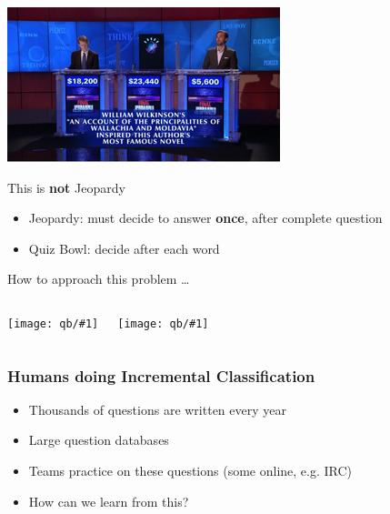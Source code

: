 \documentclass[compress]{beamer}
\newcommand{\gfxq}[2]{
\begin{center}
	\texttt{[image: qb/\#1]}
\end{center}
}
\begin{document}
\begin{frame}[plain]
  \vspace{-2cm}
		\includegraphics[width=1.0\linewidth]{qb/jeopardy}
                \pause
                \vspace{-8cm}
         \begin{block}{This is {\bf not} Jeopardy \cite{ferruci-10}}
		\begin{itemize}
                        \item Jeopardy: must decide to answer {\bf once}, after
                          complete question
                        \item Quiz Bowl: decide after each word
		\end{itemize}

	\end{block}

\end{frame}


\begin{frame}{How to approach this problem \dots}

  \begin{columns}
    \gfxq{guess}{0.8}
    \gfxq{buzzer}{0.8}
  \end{columns}
  \pause
\end{frame}


\begin{frame}
	\frametitle{Humans doing Incremental Classification}

	\begin{itemize}
		\item Thousands of questions are written every year
		\item Large question databases
		\item Teams practice on these questions (some online, e.g. IRC)
		\item How can we learn from this?
	\end{itemize}

\end{frame}
\end{document}
